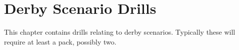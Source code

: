 \chapter{Derby Scenario Drills}
\label{ch:scenarios}

This chapter contains drills relating to derby scenarios.
Typically these will require at least a pack, possibly two. 
